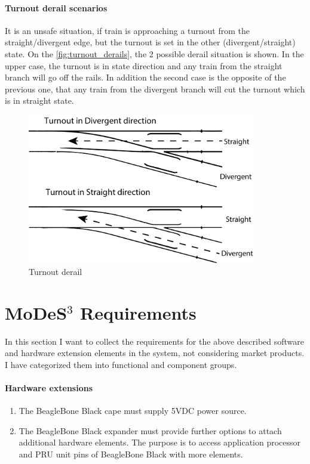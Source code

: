 \paragraph{Turnout derail scenarios}
It is an unsafe situation, if train is approaching a turnout from the straight/divergent edge, but the turnout is set in the other (divergent/straight) state. On the \autoref{fig:turnout_derails}, the 2 possible derail situation is shown. In the upper case, the turnout is in state direction and any train from the straight branch will go off the rails. In addition the second case is the opposite of the previous one, that any train from the divergent branch will cut the turnout which is in straight state.
\begin{figure}[ht]
	\centering
	\includegraphics[width=100mm, keepaspectratio]{figures/modes3/turnout_derail.png}
	\caption{Turnout derail}
	\label{fig:turnout_derails}
\end{figure}

\section{MoDeS$^3$ Requirements}\label{section:REQ}
In this section I want to collect the requirements for the above described software and hardware extension elements in the system, not considering market products. I have categorized them into functional and component groups.


\paragraph{Hardware extensions}
\begin{enumerate}[label=REQ-BBB-\arabic*, leftmargin=*, format=\small]
	\item The BeagleBone Black cape must supply 5VDC power source.
	\item The BeagleBone Black expander must provide further options to attach additional hardware elements. The purpose is to access application processor and PRU unit pins of BeagleBone Black with more elements.
\end{enumerate}

